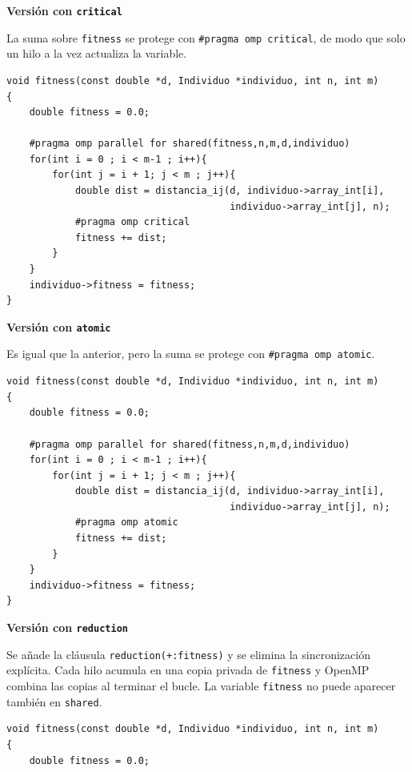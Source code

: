 \documentclass[12pt]{article}
\begin{document}
\begin{enumerate}
\medskip
\noindent\textbf{Versión con \texttt{critical}}\par
\smallskip

La suma sobre \texttt{fitness} se protege con \texttt{\#pragma omp critical}, de modo que solo un hilo a la vez actualiza la variable.

\begin{lstlisting}[style=EstiloC]
void fitness(const double *d, Individuo *individuo, int n, int m)
{
    double fitness = 0.0;

    #pragma omp parallel for shared(fitness,n,m,d,individuo)
    for(int i = 0 ; i < m-1 ; i++){
        for(int j = i + 1; j < m ; j++){
            double dist = distancia_ij(d, individuo->array_int[i],
                                       individuo->array_int[j], n);
            #pragma omp critical
            fitness += dist;
        }
    }
    individuo->fitness = fitness;
}
\end{lstlisting}

\medskip
\noindent\textbf{Versión con \texttt{atomic}}\par
\smallskip

Es igual que la anterior, pero la suma se protege con \texttt{\#pragma omp atomic}.
\begin{lstlisting}[style=EstiloC]
void fitness(const double *d, Individuo *individuo, int n, int m)
{
    double fitness = 0.0;

    #pragma omp parallel for shared(fitness,n,m,d,individuo)
    for(int i = 0 ; i < m-1 ; i++){
        for(int j = i + 1; j < m ; j++){
            double dist = distancia_ij(d, individuo->array_int[i],
                                       individuo->array_int[j], n);
            #pragma omp atomic
            fitness += dist;
        }
    }
    individuo->fitness = fitness;
}
\end{lstlisting}

\medskip
\noindent\textbf{Versión con \texttt{reduction}}\par
\smallskip

Se añade la cláusula \texttt{reduction(+:fitness)} y se elimina la sincronización explícita. Cada hilo acumula en una copia privada de \texttt{fitness} y OpenMP combina las copias al terminar el bucle. La variable \texttt{fitness} no puede aparecer también en \texttt{shared}.

\begin{lstlisting}[style=EstiloC]
void fitness(const double *d, Individuo *individuo, int n, int m)
{
    double fitness = 0.0;


\end{lstlisting}
\end{enumerate}
\end{document}
